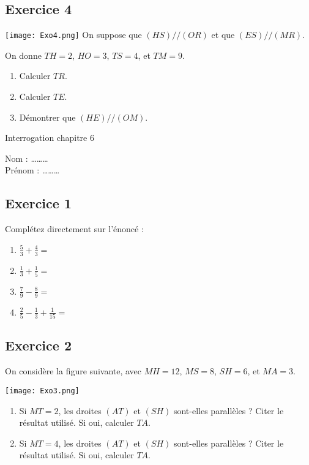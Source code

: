 \documentclass[14 pt]{extarticle}
\theoremstyle{plain}
\begin{document}
 
 \subsection*{Exercice 4}
 
 \texttt{[image: Exo4.png]}\newline
 On suppose que $(HS)//(OR)$ et que $(ES)//(MR)$. 
 
 On donne $TH = 2$, $HO = 3$, $TS= 4$, et $TM= 9$. 
 
 \begin{enumerate}
 \item Calculer $TR$. 
 \item Calculer $TE$.  
 \item Démontrer que $(HE)//(OM)$. 
 \end{enumerate}
 
 \newpage
 
 
 \begin{center}{\Large Interrogation chapitre 6}\\ 
 \end{center}
 Nom : \ldots\ldots\ldots\\
 Prénom : \ldots\ldots\ldots
 
 \subsection*{Exercice 1}
 Complétez directement sur l'énoncé : 
 
 \begin{enumerate}
 \item $\frac53 + \frac43 =  $ 
 \item $\frac13 + \frac15 =  $
 \item $\frac79 - \frac89= $ 
 \item $\frac25 - \frac13 +  \frac1{15} =  $
 \end{enumerate}
 
\subsection*{Exercice 2} 
 
On considère la figure suivante, avec $MH = 12$, $MS= 8$, $SH = 6$, et $MA = 3$. 

 \texttt{[image: Exo3.png]}\newline
\begin{enumerate}
\item Si $MT= 2$, les droites $(AT)$ et $(SH)$ sont-elles parallèles ? Citer le résultat utilisé. Si oui, calculer $TA$. 
\item Si $MT= 4$, les droites $(AT)$ et $(SH)$ sont-elles parallèles ?  Citer le résultat utilisé. Si oui, calculer $TA$. 
\end{enumerate}
 
\end{document}
